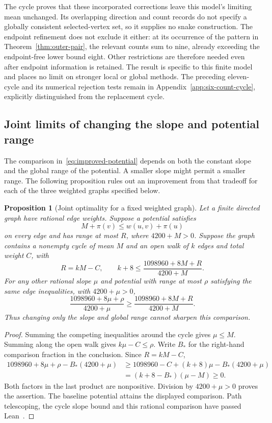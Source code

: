 \documentclass[11pt,a4paper]{article}
\newtheorem{proposition}[theorem]{Proposition}
\theoremstyle{definition}
\theoremstyle{remark}
\begin{document}
The cycle proves that these incorporated corrections leave this model's limiting mean unchanged. Its overlapping direction and count records do not specify a globally consistent selected-vertex set, so it supplies no snake construction. The endpoint refinement does not exclude it either: at its occurrence of the pattern in Theorem~\ref{thm:outer-pair}, the relevant counts sum to nine, already exceeding the endpoint-free lower bound eight. Other restrictions are therefore needed even after endpoint information is retained. The result is specific to this finite model and places no limit on stronger local or global methods. The preceding eleven-cycle and its numerical rejection tests remain in Appendix~\ref{app:six-count-cycle}, explicitly distinguished from the replacement cycle.

\subsection{Joint limits of changing the slope and potential range}\label{sec:joint-optimality}
The comparison in~\eqref{eq:improved-potential} depends on both the constant
slope and the global range of the potential. A smaller slope might permit
a smaller range. The following proposition rules out an improvement from
that tradeoff for each of the three weighted graphs specified below.

\begin{proposition}[Joint optimality for a fixed weighted graph]\label{prop:joint-potential-optimality}
Let a finite directed graph have rational edge weights. Suppose a potential
satisfies
\[
M+\pi(v)\le w(u,v)+\pi(u)
\]
on every edge and has range at most $R$, where $4200+M>0$. Suppose the graph
contains a nonempty cycle of mean $M$ and an open walk of $k$ edges and total
weight $C$, with
\[
R=kM-C,\qquad
k+8\le\frac{1098960+8M+R}{4200+M}.
\]
For any other rational slope $\mu$ and potential with range at most $\rho$
satisfying the same edge inequalities, with $4200+\mu>0$,
\[
\frac{1098960+8\mu+\rho}{4200+\mu}
\ge\frac{1098960+8M+R}{4200+M}.
\]
Thus changing only the slope and global range cannot sharpen this comparison.
\end{proposition}
\begin{proof}
Summing the competing inequalities around the cycle gives $\mu\le M$.
Summing along the open walk gives $k\mu-C\le\rho$. Write $B_*$ for the
right-hand comparison fraction in the conclusion. Since $R=kM-C$,
\[
\begin{aligned}
1098960+8\mu+\rho-B_*(4200+\mu)
&\ge1098960-C+(k+8)\mu-B_*(4200+\mu)\\
&=(k+8-B_*)(\mu-M)\ge0.
\end{aligned}
\]
Both factors in the last product are nonpositive. Division by
$4200+\mu>0$ proves the assertion. The baseline potential attains the
displayed comparison. Path telescoping, the cycle slope bound and this
rational comparison have passed Lean~\cite{potentialcomparisonarchive}.
\end{proof}
\end{document}

